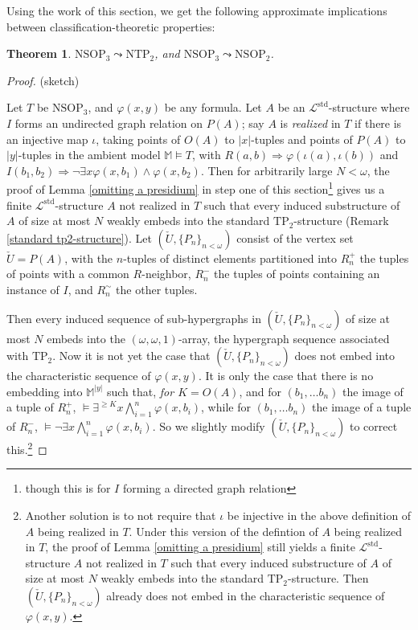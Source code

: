 \documentclass{amsart}
\newtheorem{theorem}{Theorem}[section]
\theoremstyle{definition}
\theoremstyle{remark}
\numberwithin{equation}{section}
\begin{document}
\begin{tcolorbox}
Using the work of this section, we get the following approximate implications between classification-theoretic properties:

\begin{theorem}\label{the approximate implications}
     $\mathrm{NSOP}_{3} \leadsto \mathrm{NTP}_{2}$, and $\mathrm{NSOP}_{3} \leadsto \mathrm{NSOP}_{2}$.
\end{theorem}


\begin{proof}
    (sketch) 
    
   \: Let $T$ be $\mathrm{NSOP}_{3}$, and $\varphi(x, y)$ be any formula. Let $A$ be an $\mathcal{L}^{\mathrm{std}}$-structure where $I$ forms an undirected graph relation on $P(A)$; say $A$ is \textit{realized} in $T$ if there is an injective map $\iota$, taking points of $O(A)$ to $|x|$-tuples and points of $P(A)$ to $|y|$-tuples in the ambient model $\mathbb{M} \models T$, with $R(a, b) \Rightarrow \varphi(\iota(a), \iota(b))$ and $I(b_1, b_2) \Rightarrow \neg \exists x \varphi(x, b_{1}) \wedge \varphi(x, b_{2})$. Then for arbitrarily large $N < \omega$, the proof of Lemma \ref{omitting a presidium} in step one of this section\footnote{though this is for $I$ forming a directed graph relation} gives us a finite $\mathcal{L}^{\mathrm{std}}$-structure $A$ not realized in $T$ such that every induced substructure of $A$ of size at most $N$ weakly embeds into the standard $\mathrm{TP}_{2}$-structure (Remark \ref{standard tp2-structure}). Let $( \check{U}, \{P_{n}\}_{n < \omega})$ consist of the vertex set $\check{U}=P(A)$, with the $n$-tuples of distinct elements partitioned into $R^{+}_{n}$ the tuples of points with a common $R$-neighbor, $R^{-}_{n}$ the tuples of points containing an instance of $I$, and $R^{\sim}_{n}$ the other tuples.  
   
   \: Then every induced sequence of sub-hypergraphs in  $( \check{U}, \{P_{n}\}_{n < \omega})$ of size at most $N$ embeds into the $(\omega, \omega, 1)$-array, the hypergraph sequence associated with $\mathrm{TP}_{2}$. Now it is not yet the case that $( \check{U}, \{P_{n}\}_{n < \omega})$  does not embed into the characteristic sequence of $\varphi(x, y)$. It is only the case that there is no embedding into $\mathbb{M}^{|y|}$ such that, \textit{for $K= O(A)$}, and for $(b_{1}, \ldots b_{n})$ the image of a tuple of $R^{+}_{n}$, $\models \exists^{\geq K} x \bigwedge^{n}_{i = 1} \varphi(x,b_{i})$, while for $(b_{1}, \ldots b_{n})$ the image of a tuple of $R^{-}_{n}$, $\models \neg \exists x \bigwedge^{n}_{i = 1} \varphi(x,b_{i})$. So we slightly modify $( \check{U}, \{P_{n}\}_{n < \omega})$ to correct this.\footnote{Another solution is to not require that $\iota$ be injective in the above definition of $A$ being realized in $T$. Under this version of the defintion of $A$ being realized in $T$, the proof of Lemma \ref{omitting a presidium} still yields a finite $\mathcal{L}^{\mathrm{std}}$-structure $A$ not realized in $T$ such that every induced substructure of $A$ of size at most $N$ weakly embeds into the standard $\mathrm{TP}_{2}$-structure. Then $( \check{U}, \{P_{n}\}_{n < \omega})$ already does not embed in the characteristic sequence of $\varphi(x, y)$.} 
   

\end{proof}
\end{tcolorbox}
\end{document}

